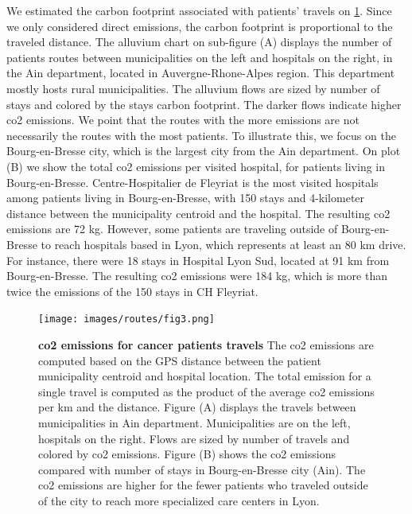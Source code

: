 We estimated the carbon footprint associated with patients' travels on
\cref{fig:routes-co2-emissions}. Since we only considered direct emissions, the
carbon footprint is proportional to the traveled distance. The alluvium chart on
sub-figure (A) displays the number of patients routes between municipalities on
the left and hospitals on the right, in the Ain department, located in
Auvergne-Rhone-Alpes region. This department mostly hosts rural municipalities.
The alluvium flows are sized by number of stays and colored by the stays carbon
footprint. The darker flows indicate higher \ac{co2} emissions. We point that
the routes with the more emissions are not necessarily the routes with the most
patients. To illustrate this, we focus on the Bourg-en-Bresse city, which is the
largest city from the Ain department. On plot (B) we show the total \ac{co2}
emissions per visited hospital, for patients living in Bourg-en-Bresse.
Centre-Hospitalier de Fleyriat is the most visited hospitals among patients
living in Bourg-en-Bresse, with 150 stays and 4-kilometer distance between the
municipality centroid and the hospital. The resulting \ac{co2} emissions are 72
kg. However, some patients are traveling outside of Bourg-en-Bresse to reach
hospitals based in Lyon, which represents at least an 80 km drive. For instance,
there were 18 stays in Hospital Lyon Sud, located at 91 km from Bourg-en-Bresse.
The resulting \ac{co2} emissions were 184 kg, which is more than twice the
emissions of the 150 stays in CH Fleyriat.

\begin{figure}[h!]
    \texttt{[image: images/routes/fig3.png]}
    \centering
    \caption{ \textbf{\ac{co2} emissions for cancer patients travels} The
        \ac{co2} emissions are computed based on the GPS distance between the
        patient municipality centroid and hospital location. The total emission
        for a single travel is computed as the product of the average \ac{co2}
        emissions per km and the distance. Figure (A) displays the travels
        between municipalities in Ain department. Municipalities are on the
        left, hospitals on the right. Flows are sized by number of travels and
        colored by \ac{co2} emissions. Figure (B) shows the \ac{co2} emissions
        compared with number of stays in Bourg-en-Bresse city (Ain). The
        \ac{co2} emissions are higher for the fewer patients who traveled
        outside of the city to reach more specialized care centers in Lyon. }
    \label{fig:routes-co2-emissions}
\end{figure}

